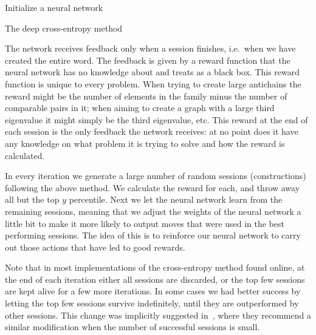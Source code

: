 \documentclass[11pt,english]{article}
\theoremstyle{plain}
\theoremstyle{remark}
\begin{document}
\begin{algorithm}[H]
\SetAlgoLined
 Initialize a neural network\;
 \caption{The deep cross-entropy method}
\end{algorithm}

\medskip

The network receives feedback only when a session finishes, i.e.~when we have created the entire word. The feedback is given by a reward function that the neural network has no knowledge about and treats as a black box. This reward function is unique to every problem. When trying to create large antichains the reward might be the number of elements in the family minus the number of comparable pairs in it; when aiming to create a graph with a large third eigenvalue it might simply be the third eigenvalue, etc. This reward at the end of each session is the only feedback the network receives: at no point does it have any knowledge on what problem it is trying to solve and how the reward is calculated. 

In every iteration we generate a large number of random sessions (constructions) following the above method. We calculate the reward for each, and throw away all but the top $y$ percentile. Next we let the neural network learn from the remaining sessions, meaning that we adjust the weights of the neural network a little bit to make it more likely to output moves that were used in the best performing sessions. The idea of this is to reinforce our neural network to carry out those actions that have led to good rewards.  

Note that in most implementations of the cross-entropy method found online, at the end of each iteration either all sessions are discarded, or the top few sessions are kept alive for a few more iterations. In some cases we had better success by letting the top few sessions survive indefinitely, until they are outperformed by other sessions. This change was implicitly suggested in~\cite{tds}, where they recommend a similar modification when the number of successful sessions is small.
\end{document}
